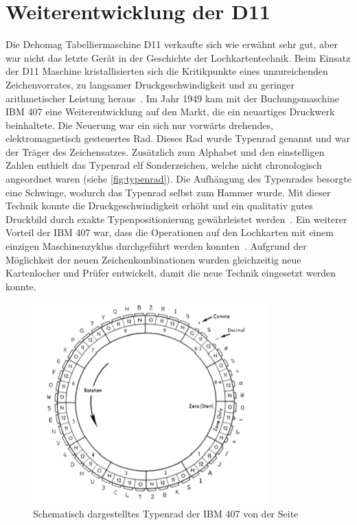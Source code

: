 \documentclass[parskip=half]{scrartcl}
\begin{document}
\section{Weiterentwicklung der D11}

Die Dehomag Tabelliermaschine D11 verkaufte sich wie erwähnt sehr gut, aber war
nicht das letzte Gerät in der Geschichte der Lochkartentechnik. Beim Einsatz
der D11 Maschine kristallisierten sich die Kritikpunkte eines unzureichenden
Zeichenvorrates, zu langsamer Druckgeschwindigkeit und zu geringer
arithmetischer Leistung heraus~\cite{sandner}. Im Jahr 1949 kam
mit der Buchungsmaschine IBM 407 eine Weiterentwicklung auf den Markt, die ein
neuartiges Druckwerk beinhaltete. Die Neuerung war ein sich nur vorwärts
drehendes, elektromagnetisch gesteuertes Rad. Dieses Rad wurde Typenrad genannt
und war der Träger des Zeichensatzes. Zusätzlich zum Alphabet und den
einstelligen Zahlen enthielt das Typenrad elf Sonderzeichen, welche nicht
chronologisch angeordnet waren (siehe \autoref{fig:typenrad}). Die Aufhängung
des Typenrades besorgte eine Schwinge, wodurch das Typenrad selbst zum Hammer
wurde. Mit dieser Technik konnte die Druckgeschwindigkeit erhöht und ein
qualitativ gutes Druckbild durch exakte Typenpositionierung gewährleistet
werden~\cite{sandner}. Ein weiterer Vorteil der IBM 407 war, dass
die Operationen auf den Lochkarten mit einem einzigen Maschinenzyklus
durchgeführt werden konnten~\cite{Boyell}. Aufgrund der Möglichkeit der
neuen Zeichenkombinationen wurden gleichzeitig neue Kartenlocher und Prüfer
entwickelt, damit die neue Technik eingesetzt werden konnte.

\begin{figure}[h]
  \centering
  \includegraphics{typenrad}
  \caption{Schematisch dargestelltes Typenrad der IBM 407 von der Seite~\cite{sandner}}
  \label{fig:typenrad}
\end{figure}
\end{document}
